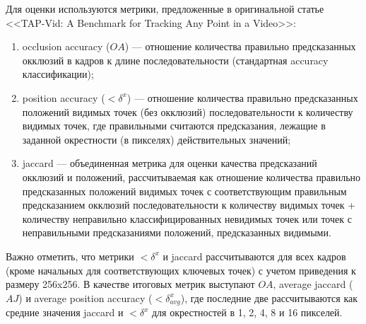 \documentclass[a4paper, 14pt]{extarticle}
\theoremstyle{definition}
\theoremstyle{plain}
\theoremstyle{remark}
\begin{document}
Для оценки используются метрики, предложенные в оригинальной статье <<TAP-Vid: A Benchmark for Tracking Any Point in a Video>>: 
\begin{enumerate}
    \item occlusion accuracy ($OA$) --- отношение количества правильно предсказанных окклюзий в  кадров к длине последовательности (стандартная accuracy классификации);
    \item position accuracy ($<\delta^x$) --- отношение количества правильно предсказанных положений видимых точек (без окклюзий) последовательности к количеству видимых точек, где правильными считаются предсказания, лежащие в заданной окрестности (в пикселях) действительных значений;
    \item jaccard --- объединенная метрика для оценки качества предсказаний окклюзий и положений, рассчитываемая как отношение количества правильно предсказанных положений видимых точек с соответствующим правильным предсказанием окклюзий последовательности к количеству видимых точек + количеству неправильно классифицированных невидимых точек или точек с неправильными предсказаниями положений, предсказанных видимыми.
\end{enumerate}
Важно отметить, что метрики $<\delta^x$ и jaccard рассчитываются для всех кадров (кроме начальных для соответствующих ключевых точек) с учетом приведения к размеру 256x256.
В качестве итоговых метрик выступают $OA$, average jaccard ($AJ$) и average position accuracy ($<\delta^x_{avg}$), где последние две рассчитываются как средние значения jaccard и $<\delta^x$ для окрестностей в 1, 2, 4, 8 и 16 пикселей.
\end{document}
